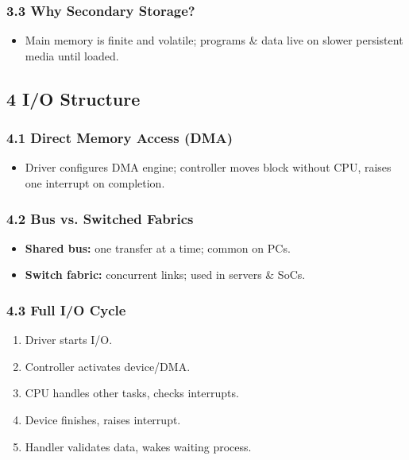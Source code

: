 \documentclass{article}
\begin{document}
\subsubsection*{3.3 Why Secondary Storage?}
\begin{itemize}
    \item Main memory is finite and volatile; programs \& data live on slower persistent media until loaded.
\end{itemize}

\subsection*{4 I/O Structure}
\subsubsection*{4.1 Direct Memory Access (DMA)}
\begin{itemize}
    \item Driver configures DMA engine; controller moves block without CPU, raises one interrupt on completion.
\end{itemize}

\subsubsection*{4.2 Bus vs. Switched Fabrics}
\begin{itemize}
    \item \textbf{Shared bus:} one transfer at a time; common on PCs.
    \item \textbf{Switch fabric:} concurrent links; used in servers \& SoCs.
\end{itemize}

\subsubsection*{4.3 Full I/O Cycle}
\begin{enumerate}[label=\arabic*.]
    \item Driver starts I/O.
    \item Controller activates device/DMA.
    \item CPU handles other tasks, checks interrupts.
    \item Device finishes, raises interrupt.
    \item Handler validates data, wakes waiting process.
\end{enumerate}
\end{document}
